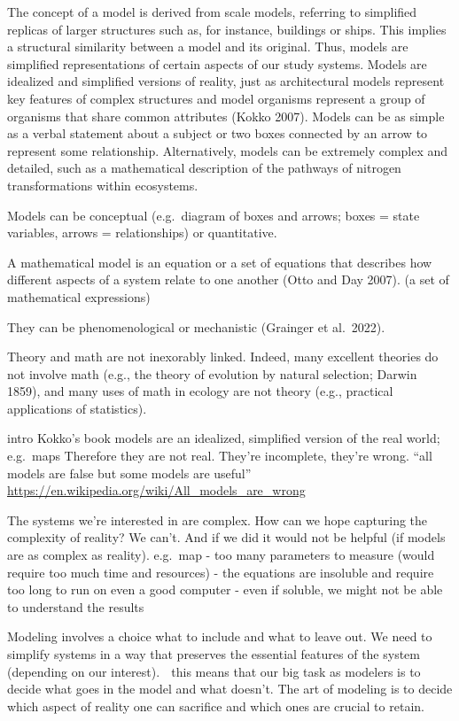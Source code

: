 \documentclass[
]{book}
\theoremstyle{definition}
\theoremstyle{definition}
\theoremstyle{definition}
\theoremstyle{definition}
\theoremstyle{remark}
\begin{document}
The concept of a model is derived from scale models, referring to simplified replicas of larger structures such as, for instance, buildings or ships. This implies a structural similarity between a model and its original.
Thus, models are simplified representations of certain aspects of our study systems.
Models are idealized and simplified versions of reality, just as architectural models represent key features of complex structures and model organisms represent a group of organisms that share common attributes (Kokko 2007).
Models can be as simple as a verbal statement about a subject or two boxes connected by an arrow to represent some relationship. Alternatively, models can be extremely complex and detailed, such as a mathematical description of the pathways of nitrogen transformations within ecosystems.

Models can be conceptual (e.g.~diagram of boxes and arrows; boxes = state variables, arrows = relationships) or quantitative.

A mathematical model is an equation or a set of equations that describes how different aspects of a system relate to one another (Otto and Day 2007). (a set of mathematical expressions)

They can be phenomenological or mechanistic (Grainger et al.~2022).

Theory and math are not inexorably linked. Indeed, many excellent theories do not involve math (e.g., the theory of evolution by natural selection; Darwin 1859), and many uses of math in ecology are not theory (e.g., practical applications of statistics).

intro Kokko's book
models are an idealized, simplified version of the real world; e.g.~maps
Therefore they are not real. They're incomplete, they're wrong.
``all models are false but some models are useful''
\url{https://en.wikipedia.org/wiki/All_models_are_wrong}

The systems we're interested in are complex. How can we hope capturing the complexity of reality? We can't.
And if we did it would not be helpful (if models are as complex as reality).
e.g.~map
- too many parameters to measure (would require too much time and resources)
- the equations are insoluble and require too long to run on even a good computer
- even if soluble, we might not be able to understand the results

Modeling involves a choice what to include and what to leave out.
We need to simplify systems in a way that preserves the essential features of the system (depending on our interest).  this means that our big task as modelers is to decide what goes in the model and what doesn't. The art of modeling is to decide which aspect of reality one can sacrifice and which ones are crucial to retain.
\end{document}
